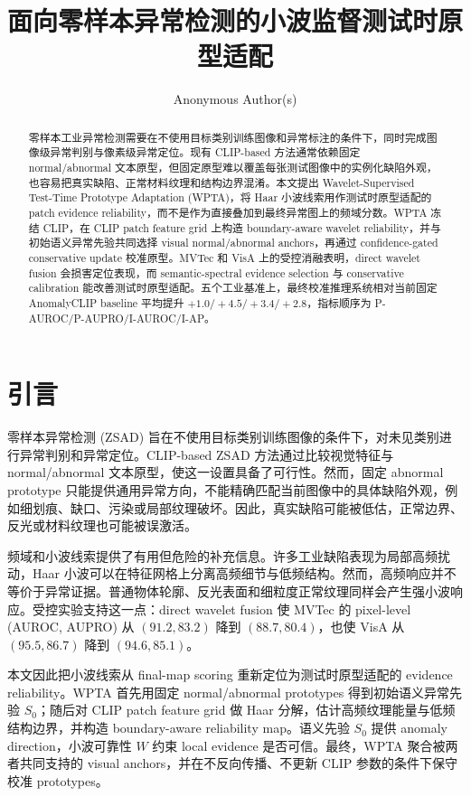 \documentclass[runningheads]{llncs}
\title{面向零样本异常检测的小波监督测试时原型适配}
\author{Anonymous Author(s)}
\institute{Anonymous Institution}
\begin{document}
\maketitle

\begin{abstract}
零样本工业异常检测需要在不使用目标类别训练图像和异常标注的条件下，同时完成图像级异常判别与像素级异常定位。现有 CLIP-based 方法通常依赖固定 normal/abnormal 文本原型，但固定原型难以覆盖每张测试图像中的实例化缺陷外观，也容易把真实缺陷、正常材料纹理和结构边界混淆。本文提出 Wavelet-Supervised Test-Time Prototype Adaptation (WPTA)，将 Haar 小波线索用作测试时原型适配的 patch evidence reliability，而不是作为直接叠加到最终异常图上的频域分数。WPTA 冻结 CLIP，在 CLIP patch feature grid 上构造 boundary-aware wavelet reliability，并与初始语义异常先验共同选择 visual normal/abnormal anchors，再通过 confidence-gated conservative update 校准原型。MVTec 和 VisA 上的受控消融表明，direct wavelet fusion 会损害定位表现，而 semantic-spectral evidence selection 与 conservative calibration 能改善测试时原型适配。五个工业基准上，最终校准推理系统相对当前固定 AnomalyCLIP baseline 平均提升 $+1.0/+4.5/+3.4/+2.8$，指标顺序为 P-AUROC/P-AUPRO/I-AUROC/I-AP。
\end{abstract}

\section{引言}

零样本异常检测 (ZSAD) 旨在不使用目标类别训练图像的条件下，对未见类别进行异常判别和异常定位。CLIP-based ZSAD 方法通过比较视觉特征与 normal/abnormal 文本原型，使这一设置具备了可行性。然而，固定 abnormal prototype 只能提供通用异常方向，不能精确匹配当前图像中的具体缺陷外观，例如细划痕、缺口、污染或局部纹理破坏。因此，真实缺陷可能被低估，正常边界、反光或材料纹理也可能被误激活。

频域和小波线索提供了有用但危险的补充信息。许多工业缺陷表现为局部高频扰动，Haar 小波可以在特征网格上分离高频细节与低频结构。然而，高频响应并不等价于异常证据。普通物体轮廓、反光表面和细粒度正常纹理同样会产生强小波响应。受控实验支持这一点：direct wavelet fusion 使 MVTec 的 pixel-level (AUROC, AUPRO) 从 $(91.2,83.2)$ 降到 $(88.7,80.4)$，也使 VisA 从 $(95.5,86.7)$ 降到 $(94.6,85.1)$。

本文因此把小波线索从 final-map scoring 重新定位为测试时原型适配的 evidence reliability。WPTA 首先用固定 normal/abnormal prototypes 得到初始语义异常先验 $S_0$；随后对 CLIP patch feature grid 做 Haar 分解，估计高频纹理能量与低频结构边界，并构造 boundary-aware reliability map。语义先验 $S_0$ 提供 anomaly direction，小波可靠性 $W$ 约束 local evidence 是否可信。最终，WPTA 聚合被两者共同支持的 visual anchors，并在不反向传播、不更新 CLIP 参数的条件下保守校准 prototypes。
\end{document}
